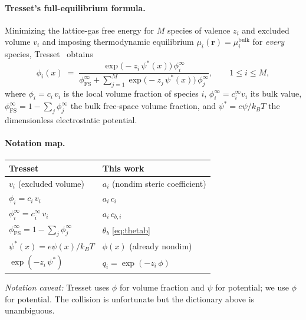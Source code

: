 \documentclass[11pt]{article}
\begin{document}
\paragraph{Tresset's full-equilibrium formula.}
Minimizing the lattice-gas free energy for $M$ species of
valence $z_i$ and excluded volume $v_i$ and imposing thermodynamic
equilibrium $\mu_i(\mathbf{r}) = \mu_i^{\mathrm{bulk}}$ for
\emph{every} species, Tresset~\cite[Eq.~(19)]{Tresset2008} obtains
\begin{equation}
\phi_i(x)
\;=\;
\frac{\exp\!\bigl(-z_i\,\psi^*(x)\bigr)\,\phi_i^\infty}
     {\phi_{\mathrm{FS}}^\infty +
      \sum_{j=1}^M \exp\!\bigl(-z_j\,\psi^*(x)\bigr)\,\phi_j^\infty},
\qquad 1 \le i \le M,
\label{eq:tresset19}
\end{equation}
where $\phi_i = c_i\,v_i$ is the local volume fraction of species
$i$, $\phi_i^\infty = c_i^\infty v_i$ its bulk value,
$\phi_{\mathrm{FS}}^\infty = 1 - \sum_j \phi_j^\infty$ the bulk
free-space volume fraction, and $\psi^* = e\psi/k_BT$ the
dimensionless electrostatic potential.

\paragraph{Notation map.}
\begin{center}
\begin{tabular}{ll}
\toprule
Tresset~\cite{Tresset2008} & This work \\
\midrule
$v_i$ (excluded volume) & $a_i$ (nondim steric coefficient) \\
$\phi_i = c_i\,v_i$ & $a_i\,c_i$ \\
$\phi_i^\infty = c_i^\infty\,v_i$ & $a_i\,c_{b,i}$ \\
$\phi_{\mathrm{FS}}^\infty = 1 - \sum_j \phi_j^\infty$ & $\theta_b$ \eqref{eq:thetab} \\
$\psi^*(x) = e\psi(x)/k_BT$ & $\phi(x)$ (already nondim) \\
$\exp(-z_i\,\psi^*)$ & $q_i = \exp(-z_i\,\phi)$ \\
\bottomrule
\end{tabular}
\end{center}
\emph{Notation caveat:} Tresset uses $\phi$ for volume fraction and
$\psi$ for potential; we use $\phi$ for potential. The collision is
unfortunate but the dictionary above is unambiguous.
\end{document}
